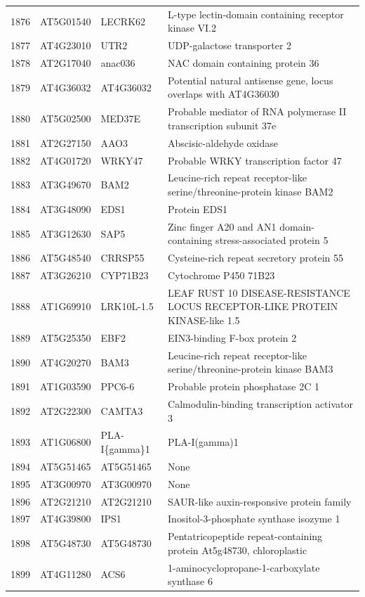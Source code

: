 \documentclass[11pt]{article}
\begin{document}
\begin{center}
\begin{tabular}{rlll}
1876 & AT5G01540 & LECRK62 & L-type lectin-domain containing receptor kinase VI.2\\
1877 & AT4G23010 & UTR2 & UDP-galactose transporter 2\\
1878 & AT2G17040 & anac036 & NAC domain containing protein 36\\
1879 & AT4G36032 & AT4G36032 & Potential natural antisense gene, locus overlaps with AT4G36030\\
1880 & AT5G02500 & MED37E & Probable mediator of RNA polymerase II transcription subunit 37e\\
1881 & AT2G27150 & AAO3 & Abscisic-aldehyde oxidase\\
1882 & AT4G01720 & WRKY47 & Probable WRKY transcription factor 47\\
1883 & AT3G49670 & BAM2 & Leucine-rich repeat receptor-like serine/threonine-protein kinase BAM2\\
1884 & AT3G48090 & EDS1 & Protein EDS1\\
1885 & AT3G12630 & SAP5 & Zinc finger A20 and AN1 domain-containing stress-associated protein 5\\
1886 & AT5G48540 & CRRSP55 & Cysteine-rich repeat secretory protein 55\\
1887 & AT3G26210 & CYP71B23 & Cytochrome P450 71B23\\
1888 & AT1G69910 & LRK10L-1.5 & LEAF RUST 10 DISEASE-RESISTANCE LOCUS RECEPTOR-LIKE PROTEIN KINASE-like 1.5\\
1889 & AT5G25350 & EBF2 & EIN3-binding F-box protein 2\\
1890 & AT4G20270 & BAM3 & Leucine-rich repeat receptor-like serine/threonine-protein kinase BAM3\\
1891 & AT1G03590 & PPC6-6 & Probable protein phosphatase 2C 1\\
1892 & AT2G22300 & CAMTA3 & Calmodulin-binding transcription activator 3\\
1893 & AT1G06800 & PLA-I\{gamma\}1 & PLA-I(gamma)1\\
1894 & AT5G51465 & AT5G51465 & None\\
1895 & AT3G00970 & AT3G00970 & None\\
1896 & AT2G21210 & AT2G21210 & SAUR-like auxin-responsive protein family\\
1897 & AT4G39800 & IPS1 & Inositol-3-phosphate synthase isozyme 1\\
1898 & AT5G48730 & AT5G48730 & Pentatricopeptide repeat-containing protein At5g48730, chloroplastic\\
1899 & AT4G11280 & ACS6 & 1-aminocyclopropane-1-carboxylate synthase 6\\

\end{tabular}
\end{center}
\end{document}
